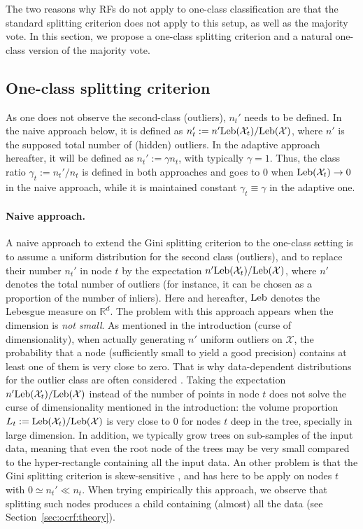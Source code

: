 The two reasons why RFs do not apply to one-class classification are that the standard splitting criterion does not apply to this setup, as well as the majority vote. In this section, we propose a one-class splitting criterion and a natural one-class version of the majority vote.


\subsection{One-class splitting criterion}
\label{sec:one-class-crit}
As one does not observe the second-class (outliers), $n_t'$ needs to be defined. In the naive approach below, it is defined as $n_t':= n' \text{Leb}(\mathcal{X}_t) / \text{Leb}(\mathcal{X})$, where $n'$ is the supposed total number of (hidden) outliers. In the adaptive approach hereafter, it will be defined as $n_t' := \gamma n_t$, with typically $\gamma=1$. Thus, the class ratio $\gamma_t := n_t'/n_t$ is defined in both approaches and goes to $0$ when $\text{Leb}(\mathcal{X}_t) \to 0$ in the naive approach, while it is maintained constant $\gamma_t \equiv \gamma$ in the adaptive one.
\paragraph{Naive approach.}
A naive approach to extend the Gini splitting criterion to the one-class setting is to assume a  uniform distribution for the second class (outliers), and to replace their number $n_t'$ in node $t$ by the expectation $n' \text{Leb}(\mathcal{X}_t) / \text{Leb}(\mathcal{X})$, where $n'$ denotes the total number of outliers (for instance, it can be chosen as a proportion of the number of inliers).
Here and hereafter, $\text{Leb}$ denotes the Lebesgue measure on $\mathbb{R}^d$.
%
The problem with this approach appears when the dimension is \emph{not small}. As mentioned in the introduction (curse of dimensionality),
when actually generating $n'$ uniform outliers on $\mathcal{X}$, the probability that a node (sufficiently small to yield a good precision) contains at least one of them is very close to zero. That is why data-dependent distributions for the outlier class are often considered \citep{Desir12, Shi2012}.
%
Taking the expectation $n' \text{Leb}(\mathcal{X}_t) / \text{Leb}(\mathcal{X})$ instead of the number of points in node $t$ does not solve the curse of dimensionality mentioned in the introduction:
the volume proportion $L_t:=\text{Leb}(\mathcal{X}_t) / \text{Leb}(\mathcal{X})$ is very close to $0$ for nodes $t$ deep in the tree, specially in large dimension.
%
In addition, we typically grow trees on sub-samples of the input data, meaning that even the root node of the trees may be very small compared to the hyper-rectangle containing all the input data.
%
An other problem is that the Gini splitting criterion is skew-sensitive \citep{Flach2003}, and has here to be apply on nodes $t$ with $0 \simeq n_t' \ll n_t$. When trying empirically this approach, we observe that splitting such nodes produces a child containing (almost) all the data (see Section~\ref{sec:ocrf:theory}).


